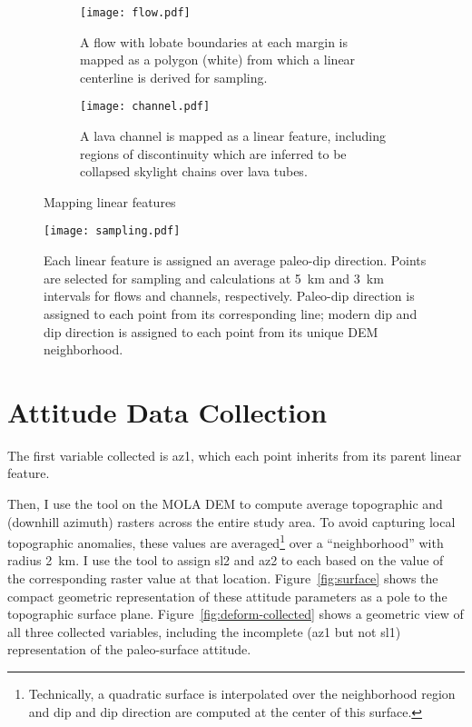 \begin{figure}
    \centering
    \begin{subfigure}{\textwidth}
        \centering
        \texttt{[image: flow.pdf]}
        \caption[Mapped lava flow \& centerline]{A flow with lobate boundaries at each margin is mapped as a polygon (white) from which a linear centerline is derived for sampling.}%
        \label{fig:flow}
    \end{subfigure}
    \begin{subfigure}{\textwidth}
        \centering
        \texttt{[image: channel.pdf]}
        \caption[Mapped lava channel]{A lava channel is mapped as a linear feature, including regions of discontinuity which are inferred to be collapsed skylight chains over lava tubes.}%
        \label{fig:channel}
    \end{subfigure}
    \caption{Mapping linear features}%
    \label{fig:mapping-linear}
\end{figure}

\begin{figure}
    \centering
    \texttt{[image: sampling.pdf]}
    \caption[Sampling site selection]{Each linear feature is assigned an average paleo-dip direction. Points are selected for sampling and calculations at \qty{5}{\km} and \qty{3}{\km} intervals for flows and channels, respectively. Paleo-dip direction is assigned to each point from its corresponding line; modern dip and dip direction is assigned to each point from its unique \ac{DEM} neighborhood.}%
    \label{fig:sampling}
\end{figure}

\section{Attitude Data Collection}

\newcommand{\neighborhood}{\qty{2}{\km}}

The first variable collected is \ac{az1}, which each point inherits from its parent linear feature.

Then, I use the  tool on the \ac{MOLA} \ac{DEM} to compute average topographic  and  (downhill azimuth) rasters across the entire study area. To avoid capturing local topographic anomalies, these values are averaged\footnote{Technically, a quadratic surface is interpolated over the neighborhood region and dip and dip direction are computed at the center of this surface.} over a ``neighborhood'' with radius \neighborhood. I use the  tool to assign \ac{sl2} and \ac{az2} to each based on the value of the corresponding raster value at that location. Figure~\ref{fig:surface} shows the compact geometric representation of these attitude parameters as a pole to the topographic surface plane. Figure~\ref{fig:deform-collected} shows a geometric view of all three collected variables, including the incomplete (\acs{az1} but not \acs{sl1}) representation of the paleo-surface attitude.

